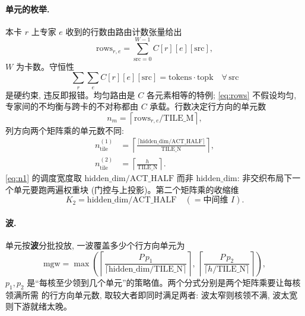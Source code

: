 \documentclass[11pt,a4paper]{article}
\newcommand{\TILEM}{\mathrm{TILE\_M}}
\newcommand{\TILEN}{\mathrm{TILE\_N}}
\newcommand{\ACTHALF}{\mathrm{ACT\_HALF}}
\begin{document}
\paragraph{单元的枚举.} 本卡 $r$ 上专家 $e$ 收到的行数由路由计数张量给出
\begin{equation}
\text{rows}_{r,e} = \sum_{\text{src}=0}^{W-1} C[r][e][\text{src}] ,
\label{eq:rows}
\end{equation}
$W$ 为卡数。守恒性
\begin{equation}
\sum_{r}\sum_{e} C[r][e][\text{src}] = \text{tokens}\cdot\text{topk}
\quad \forall\, \text{src}
\label{eq:conserve}
\end{equation}
是硬约束, 违反即报错。均匀路由是 $C$ 各元素相等的特例; \eqref{eq:rows} 不假设均匀,
专家间的不均衡与跨卡的不对称都由 $C$ 承载。行数决定行方向的单元数
\begin{equation}
n_m = \left\lceil \text{rows}_{r,e} / \TILEM \right\rceil ,
\label{eq:nm}
\end{equation}
列方向两个矩阵乘的单元数不同:
\begin{align}
n^{(1)}_{\text{tile}} &= \left\lceil \frac{\lceil \mathrm{hidden\_dim}/\ACTHALF \rceil}{\TILEN} \right\rceil ,
   \label{eq:n1}\\
n^{(2)}_{\text{tile}} &= \left\lceil \frac{h}{\TILEN} \right\rceil .
   \label{eq:n2}
\end{align}
\eqref{eq:n1} 的调度宽度取 $\mathrm{hidden\_dim}/\ACTHALF$ 而非 $\mathrm{hidden\_dim}$:
非交织布局下一个单元要跑两遍权重块 (门控与上投影)。第二个矩阵乘的收缩维
\begin{equation}
K_2 = \mathrm{hidden\_dim}/\ACTHALF \quad (=\text{中间维 } I).
\label{eq:k2}
\end{equation}

\paragraph{波.} 单元按\textbf{波}分批投放, 一波覆盖多少个行方向单元为
\begin{equation}
\mathrm{mgw} = \max\left(
  \left\lceil \frac{P\,p_1}{\lceil \mathrm{hidden\_dim}/\TILEN \rceil} \right\rceil,\
  \left\lceil \frac{P\,p_2}{\lceil h/\TILEN \rceil} \right\rceil \right),
\label{eq:mgw}
\end{equation}
$p_1,p_2$ 是``每核至少领到几个单元''的策略值。两个分式分别是两个矩阵乘要让每核领满所需
的行方向单元数, 取较大者即同时满足两者: 波太窄则核领不满, 波太宽则下游就绪太晚。

\end{document}
